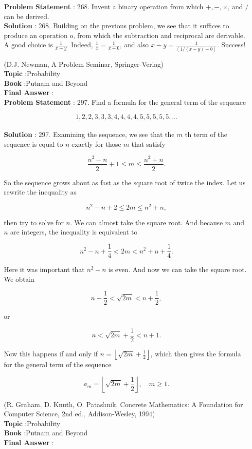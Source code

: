 \documentclass[10pt]{article}
\begin{document}
\textbf{Problem Statement} :
268. Invent a binary operation from which $+,-, \times$, and / can be derived.
\\
\textbf{Solution} :
268. Building on the previous problem, we see that it suffices to produce an operation o, from which the subtraction and reciprocal are derivable. A good choice is $\frac{1}{x-y}$. Indeed, $\frac{1}{x}=\frac{1}{x-0}$, and also $x-y=\frac{1}{(1 /(x-y)-0)}$. Success!

(D.J. Newman, A Problem Seminar, Springer-Verlag) 
\\
\textbf{Topic} :Probability\\
\textbf{Book} :Putnam and Beyond\\
\textbf{Final Answer} :\\


\textbf{Problem Statement} :
297. Find a formula for the general term of the sequence

$$
1,2,2,3,3,3,4,4,4,4,5,5,5,5,5, \ldots
$$
\\
\textbf{Solution} :
297. Examining the sequence, we see that the $m$ th term of the sequence is equal to $n$ exactly for those $m$ that satisfy

$$
\frac{n^{2}-n}{2}+1 \leq m \leq \frac{n^{2}+n}{2} .
$$

So the sequence grows about as fast as the square root of twice the index. Let us rewrite the inequality as

$$
n^{2}-n+2 \leq 2 m \leq n^{2}+n,
$$

then try to solve for $n$. We can almost take the square root. And because $m$ and $n$ are integers, the inequality is equivalent to

$$
n^{2}-n+\frac{1}{4}<2 m<n^{2}+n+\frac{1}{4} .
$$

Here it was important that $n^{2}-n$ is even. And now we can take the square root. We obtain

$$
n-\frac{1}{2}<\sqrt{2 m}<n+\frac{1}{2},
$$

or

$$
n<\sqrt{2 m}+\frac{1}{2}<n+1 .
$$

Now this happens if and only if $n=\left\lfloor\sqrt{2 m}+\frac{1}{2}\right\rfloor$, which then gives the formula for the general term of the sequence

$$
a_{m}=\left\lfloor\sqrt{2 m}+\frac{1}{2}\right\rfloor, \quad m \geq 1 .
$$

(R. Graham, D. Knuth, O. Patashnik, Concrete Mathematics: A Foundation for Computer Science, 2nd ed., Addison-Wesley, 1994) 
\\
\textbf{Topic} :Probability\\
\textbf{Book} :Putnam and Beyond\\
\textbf{Final Answer} :\\
\end{document}
